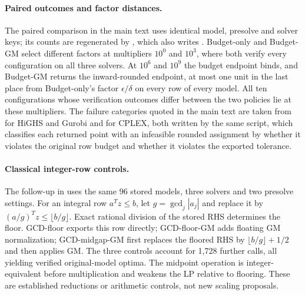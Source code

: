 \documentclass[11pt]{article}
\begin{document}
\begin{table}[tb]
\centering\small
\caption{Enumerated stress experiment, 192 planned configurations per policy and solver.
``Verified'' means that the returned point passes the declared acceptance rule and its
rounded assignment attains the independently enumerated optimum. ``Other'' includes
unverified outputs and solver errors; ``Abstain'' means no optimizer call was attempted.
Abstention is not a performance success. The separated GCD-floor row is the later
integer-aware control, with the same denominator and acceptance rule.}\label{tab:budget-results}

\end{table}

\paragraph{Paired outcomes and factor distances.}
The paired comparison in the main text uses identical model, presolve and solver keys; its
counts are regenerated by , which also writes
. Budget-only and Budget-GM select different factors at
multipliers $10^0$ and $10^3$, where both verify every configuration on all three solvers. At $10^6$
and $10^9$ the budget endpoint binds, and Budget-GM returns the inward-rounded endpoint, at most
one unit in the last place from Budget-only's factor $\epsilon/\delta$ on every row of every
model. All ten configurations whose verification outcomes differ between the two policies lie at
these multipliers. The failure categories quoted in the main text are taken from
 for HiGHS and Gurobi and
 for CPLEX, both written by the same script, which
classifies each returned point with an infeasible rounded assignment by whether it violates the
original row budget and whether it violates the exported tolerance.

\paragraph{Classical integer-row controls.}
The follow-up in 
uses the same 96 stored models, three solvers and two presolve settings. For an
integral row $a^Tz\le b$, let $g=\gcd_j |a_j|$ and replace it by
$(a/g)^Tz\le\lfloor b/g\rfloor$. Exact rational division of the stored RHS
determines the floor. GCD-floor exports this row directly; GCD-floor-GM adds
floating GM normalization; GCD-midgap-GM first replaces the floored RHS by
$\lfloor b/g\rfloor+1/2$ and then applies GM. The three controls account for
1,728 further calls, all yielding verified original-model optima. The midpoint
operation is integer-equivalent before multiplication and weakens the LP relative
to flooring. These are established reductions or arithmetic controls, not new
scaling proposals.
\end{document}
